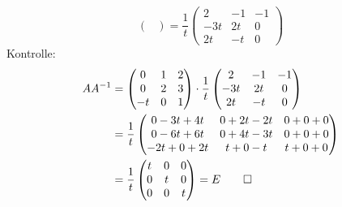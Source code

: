 \begin{loesung}
\[\begin{pmatrix}
\end{pmatrix}
=
\frac1t
\begin{pmatrix}
 2 &-1 &-1\\
-3t& 2t& 0\\
 2t& -t& 0
\end{pmatrix}
\]
Kontrolle:
\begin{align*}
AA^{-1}
&=
\begin{pmatrix}
 0& 1& 2\\
 0& 2& 3\\
-t& 0& 1
\end{pmatrix}
\cdot
\frac1t
\begin{pmatrix}
 2 &-1 &-1\\
-3t& 2t& 0\\
 2t& -t& 0
\end{pmatrix}
\\
&=
\frac1t
\begin{pmatrix}
0-3t+4t&0+2t-2t&0+0+0\\
0-6t+6t&0+4t-3t&0+0+0\\
-2t+0+2t&t+0-t&t+0+0
\end{pmatrix}
\\
&=\frac1t\begin{pmatrix}t&0&0\\0&t&0\\0&0&t\end{pmatrix}=E
\qedhere
\end{align*}
\end{loesung}

